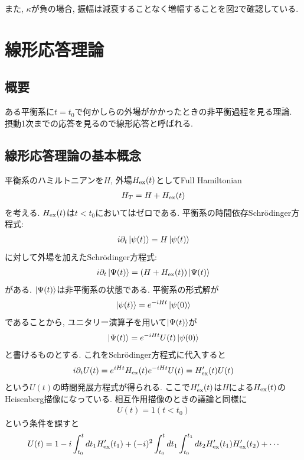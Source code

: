 \documentclass[10.5pt,a4paper]{jreport}
\begin{document}
また, $\kappa$が負の場合, 振幅は減衰することなく増幅することを図2で確認している.
\section{線形応答理論}
\subsection{概要}
ある平衡系に$t = t_0$で何かしらの外場がかかったときの非平衡過程を見る理論. 摂動1次までの応答を見るので線形応答と呼ばれる.
\subsection{線形応答理論の基本概念}
平衡系のハミルトニアンを$H$, 外場$H_{\rm ex}(t)$としてFull Hamiltonian
\begin{eqnarray}
 H_{T} = H + H_{\rm ex}(t)
\end{eqnarray}
を考える. $H_{\rm ex}(t)$は$t< t_0$においてはゼロである. 平衡系の時間依存Schr\"odinger方程式:
\begin{eqnarray}
  i\partial_t\ket{\psi(t)} = H\ket{\psi(t)}
\end{eqnarray}
に対して外場を加えたSchr\"odinger方程式:
\begin{eqnarray}
  i\partial_t\ket{\Psi(t)} = \qty(H + H_{\rm ex}(t))\ket{\Psi(t)}
\end{eqnarray}
がある. $\ket{\Psi(t)}$は非平衡系の状態である. 平衡系の形式解が
\begin{eqnarray}
  \ket{\psi(t)} = e^{-iHt}\ket{\psi(0)}
\end{eqnarray}
であることから, ユニタリー演算子を用いて$\ket{\Psi(t)}$が
\begin{eqnarray}
  \ket{\Psi(t)} = e^{-iHt}U(t)\ket{\psi(0)}
\end{eqnarray}
と書けるものとする. これをSchr\"odinger方程式に代入すると
\begin{eqnarray}
  i\partial_t U(t) = e^{iHt}H_{\rm ex}(t)e^{-iHt}U(t) = H'_{\rm ex}(t)U(t)
\end{eqnarray}
という$U(t)$の時間発展方程式が得られる. ここで$H'_{\rm ex}(t)$は$H$による$H_{\rm ex}(t)$のHeisenberg描像になっている. 相互作用描像のときの議論と同様に
\begin{eqnarray}
  U(t) = 1 (t < t_0)
\end{eqnarray}
という条件を課すと
\begin{eqnarray}
  U(t) = 1 -i\int_{t_0}^{t}dt_1H'_{\rm ex}(t_1) + (-i)^2\int_{t_0}^{t}dt_1\int_{t_0}^{t_1}dt_2H'_{\rm ex}(t_1)H'_{\rm ex}(t_2) + \cdots
\end{eqnarray}
\end{document}
